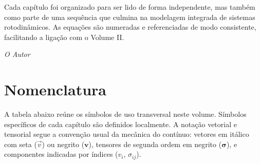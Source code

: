 \documentclass[12pt,a4paper]{article}
\numberwithin{equation}{section}
\numberwithin{table}{section}
\numberwithin{figure}{section}
\begin{document}
Cada capítulo foi organizado para ser lido de forma independente, mas também
como parte de uma sequência que culmina na modelagem integrada de sistemas
rotodinâmicos. As equações são numeradas e referenciadas de modo consistente,
 facilitando a ligação com o Volume II.

\vspace{1em}
\hfill \textit{O Autor}

	\newpage
	\tableofcontents
	\newpage

	\listoffigures
	\newpage
	\listoftables
	\newpage

\newpage
\section*{Nomenclatura}

A tabela abaixo reúne os símbolos de uso transversal neste volume. Símbolos
específicos de cada capítulo são definidos localmente. A notação vetorial e
tensorial segue a convenção usual da mecânica do contínuo: vetores em
itálico com seta ($\vec{v}$) ou negrito ($\mathbf{v}$), tensores de segunda
ordem em negrito ($\boldsymbol{\sigma}$), e componentes indicadas por
índices ($v_i$, $\sigma_{ij}$).
\end{document}
